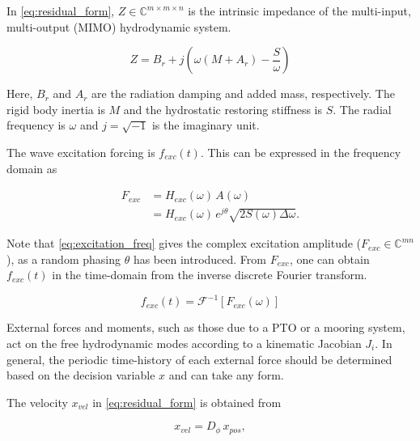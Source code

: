 \documentclass[]{article}
\begin{document}
In \eqref{eq:residual_form}, $Z\in \mathbb{C}^{m\times{}m\times{}n}$ is the intrinsic impedance of the multi-input, multi-output (MIMO) hydrodynamic system.

\begin{equation}
	Z = B_r + j\left( \omega\left(  M + A_r \right) -\frac{S}{\omega} \right)
\end{equation}

\noindent{}Here, $B_r$ and $A_r$ are the radiation damping and added mass, respectively.
The rigid body inertia is $M$ and the hydrostatic restoring stiffness is $S$.
The radial frequency is $\omega$ and $j=\sqrt{-1}$ is the imaginary unit.

The wave excitation forcing is $f_{exc}(t)$.
This can be expressed in the frequency domain as

\begin{equation}\label{eq:excitation_freq}
	\begin{aligned}
		F_{exc} &= H_{exc}(\omega) \, A(\omega) \\
		&= H_{exc} (\omega) \, e^{j \theta} \sqrt{2 S(\omega) \Delta \omega}.
	\end{aligned}
\end{equation}

\noindent{}Note that \eqref{eq:excitation_freq} gives the complex excitation amplitude ($F_{exc} \in \mathbb{C}^{mn}$), as a random phasing $\theta$ has been introduced.
From $F_{exc}$, one can obtain $f_{exc}(t)$ in the time-domain from the inverse discrete Fourier transform.

\begin{equation}
	f_{exc}(t) = \mathcal{F}^{-1} \left[ F_{exc}(\omega) \right]
\end{equation}

External forces and moments, such as those due to a PTO or a mooring system, act on the free hydrodynamic modes according to a kinematic Jacobian $J_i$.
In general, the periodic time-history of each external force should be determined based on the decision variable $x$ and can take any form.


The velocity $x_{vel}$ in \eqref{eq:residual_form} is obtained from

\begin{equation}
	x_{vel} = D_{\phi} \, x_{pos},
\end{equation}
\end{document}
